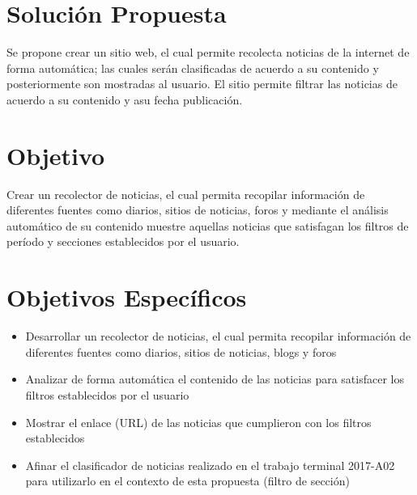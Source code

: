 \section{Solución Propuesta}


Se propone crear un sitio web, el cual permite recolecta noticias de la internet de forma automática; las cuales serán  clasificadas de acuerdo a su contenido y posteriormente son mostradas al usuario. El sitio permite filtrar las noticias de acuerdo a su contenido y asu fecha publicación.


\section{Objetivo}

  Crear un recolector de noticias, el cual permita recopilar información de diferentes fuentes como diarios, sitios de noticias, foros y mediante el análisis automático de su contenido muestre aquellas noticias que satisfagan los filtros de período y secciones establecidos por el usuario.
  

\section{Objetivos Específicos}
\begin{itemize}
  \item Desarrollar un recolector de noticias, el cual permita recopilar información de diferentes fuentes como diarios, sitios de noticias, blogs y foros
  \item Analizar de forma automática el contenido de las noticias para satisfacer los filtros establecidos por el usuario
  \item Mostrar el enlace (URL) de las noticias que cumplieron con los filtros establecidos
  \item Afinar el clasificador de noticias realizado en el trabajo terminal 2017-A02 para utilizarlo en el contexto de esta propuesta (filtro de sección) 

\end{itemize}